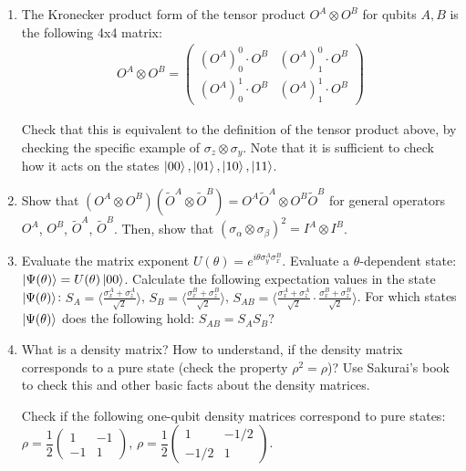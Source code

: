 \documentclass[11pt, a4paper, tightenlines, notitlepage]{revtex4-1}
\begin{document}
\begin{enumerate}
\item The Kronecker product form of the tensor product $O^A\otimes O^B$ for qubits $A,B$ is the following 4x4 matrix:
\begin{align}
O^A\otimes O^B=\begin{pmatrix}
(O^A)^0_0\cdot O^B &(O^A)^0_1\cdot O^B\\
(O^A)^1_0\cdot O^B &(O^A)^1_1\cdot O^B
\end{pmatrix}
\end{align}

Check that this is equivalent to the definition of the tensor product above, by checking the specific example of $\sigma_z\otimes\sigma_y$. Note that it is sufficient to check how it acts on the states $\ket{00},\ket{01},\ket{10},\ket{11}$.

\item Show that $(O^A\otimes O^B)(\tilde{O}^A\otimes \tilde{O}^B)=O^A\tilde{O}^A\otimes O^B\tilde{O}^B$ for general operators $O^A$, $O^B$, $\tilde{O}^A$, $\tilde{O}^B$. Then, show that $(\sigma_\alpha\otimes\sigma_\beta)^2=I^A\otimes I^B$.

\item Evaluate the matrix exponent $U(\theta)=e^{i\theta\sigma^A_y\sigma^B_x}$. Evaluate a $\theta$-dependent state: $\ket{\Psi(\theta)}=U(\theta)\ket{00}$. Calculate the following expectation values in the state $\ket{\Psi(\theta)}$: $S_A=\langle\frac{\sigma^A_x+\sigma^A_z}{\sqrt{2}}\rangle$, $S_B=\langle\frac{\sigma^B_x+\sigma^B_z}{\sqrt{2}}\rangle$, $S_{AB}=\langle\frac{\sigma^A_x+\sigma^A_z}{\sqrt{2}}\cdot\frac{\sigma^B_x+\sigma^B_z}{\sqrt{2}}\rangle$. For which states $\ket{\Psi (\theta)}$ does the following hold: $S_{AB}=S_AS_B$?

\item What is a density matrix? How to understand, if the density matrix corresponds to a pure state (check the property $\rho^2=\rho$)? Use Sakurai's book to check this and other basic facts about the density matrices.

Check if the following one-qubit density matrices correspond to pure states: $\rho=\dfrac{1}{2}\begin{pmatrix}
1 & -1\\
-1 & 1
\end{pmatrix}$, $\rho=\dfrac{1}{2}\begin{pmatrix}
1 & -1/2\\
-1/2 & 1
\end{pmatrix}$.


\end{enumerate}
\end{document}
